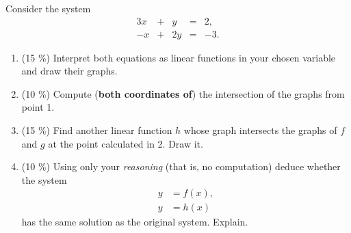 \documentclass[a4paper,11pt]{article}
\begin{document}
Consider the system
\[
 \begin{array}{ccccc}
  3x & + & y & = & 2,\\
  -x & + & 2y & = & -3.
 \end{array}
\]
\begin{enumerate}
 \item (15 \%) Interpret both equations as linear functions in your chosen
  variable and draw their graphs.
 \item (10 \%) Compute (\textbf{both coordinates of}) the intersection of the
  graphs from point 1.
 \item (15 \%) Find another linear function $h$ whose graph intersects the
  graphs of $f$ and $g$ at the point calculated in 2. Draw it.
 \item (10 \%) Using only your \emph{reasoning} (that is, no computation) deduce
  whether the system
  \begin{align*}
   y &= f(x),\\
   y &= h(x)
  \end{align*}
  has the same solution as the original system. Explain.
\end{enumerate}
\end{document}
